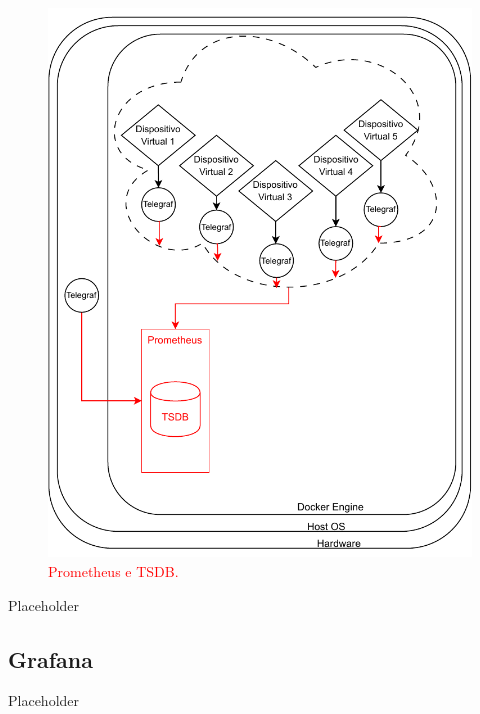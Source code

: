 {\begin{figure}[H]
\centering
\includegraphics[scale=1]{Imagens/chap03/by-blocks/prometheus_diagram.pdf}
\caption{\textcolor{red}{Prometheus e TSDB.}}
\label{fig:DiagramaPrometheusTSDB}
\end{figure}


Placeholder

\subsection{Grafana}
\label{subsection:GrafanaVisualizacao}

Placeholder

}
